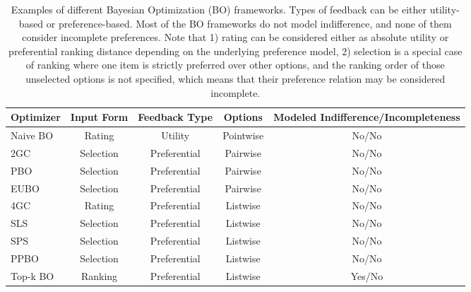 \documentclass[acmsmall,screen,nonacm]{acmart}
\begin{document}
\begin{table}[t]
\caption{Examples of different Bayesian Optimization (BO) frameworks. Types of feedback can be either utility-based or preference-based. Most of the BO frameworks do not model indifference, and none of them consider incomplete preferences. Note that 1) rating can be considered either as absolute utility or preferential ranking distance depending on the underlying preference model, 2) selection is a special case of ranking where one item is strictly preferred over other options, and the ranking order of those unselected options is not specified, which means that their preference relation may be considered incomplete.}
\centering
\begin{tabularx}{\columnwidth}{Xcccc}
\toprule
\textbf{\footnotesize Optimizer} & \textbf{\footnotesize Input Form} & \textbf{\footnotesize Feedback Type} & \textbf{\footnotesize Options} & \textbf{\footnotesize Modeled Indifference/Incompleteness} \\
\midrule
Naive BO~\cite{močkus1975on} & Rating & Utility & Pointwise & No/No \\
\midrule
2GC~\cite{brochu2007active} & Selection & Preferential & Pairwise & No/No \\
PBO~\cite{gonzalez2017pbo} & Selection & Preferential & Pairwise & No/No\\
EUBO~\cite{lin2022preference} & Selection & Preferential & Pairwise & No/No \\
4GC~\cite{brochu2010animation} & Rating & Preferential & Listwise & No/No \\
SLS~\cite{koyama2017sequential} & Selection & Preferential & Listwise & No/No \\
SPS~\cite{koyama2020sequential} & Selection & Preferential & Listwise & No/No \\
PPBO ~\cite{mikkola2020projective} & Selection & Preferential & Listwise & No/No \\
Top-k BO~\cite{nguyen2021topk} & Ranking & Preferential & Listwise & Yes/No \\
\bottomrule
\end{tabularx}
\label{tab:bo-optimizers}
\end{table}
\end{document}
